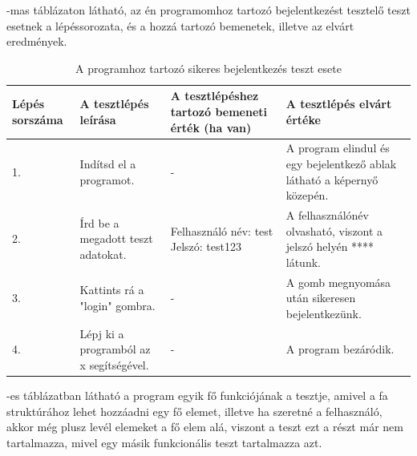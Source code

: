 -mas táblázaton látható, az én programomhoz tartozó bejelentkezést tesztelő teszt esetnek a lépéssorozata, és a hozzá tartozó bemenetek, illetve az elvárt eredmények.

\begin{table} [h]
	\begin{center}
		\caption{A programhoz tartozó sikeres bejelentkezés teszt esete}
		\label{table:successcase}
		\resizebox{\textwidth}{!} {
			\begin{tabular}{ |p{3cm}|p{5cm}|p{5cm}|p{5cm}| } 
				\hline
				Lépés sorszáma & A tesztlépés leírása & A tesztlépéshez tartozó bemeneti érték (ha van) & A tesztlépés elvárt értéke  \\ 
				\hline
				1. & Indítsd el a programot. & - & A program elindul és egy bejelentkező ablak látható a képernyő közepén.  \\ 
				\hline
				2. & Írd be a megadott teszt adatokat. & Felhasználó név: test \newline Jelszó: test123 & A felhasználónév olvasható, viszont a jelszó helyén **** látunk.\\ 
				\hline
				3. & Kattints rá a "login" gombra. & - & A gomb megnyomása után sikeresen bejelentkezünk. \\
				\hline
				4. & Lépj ki a programból az x segítségével. & - & A program bezáródik. \\
				\hline
			\end{tabular}
		}
	\end{center}

\end{table}

-es táblázatban látható a program egyik fő funkciójának a tesztje, amivel a fa struktúrához lehet hozzáadni egy fő elemet, illetve ha szeretné a felhasználó, akkor még plusz levél elemeket a fő elem alá, viszont a teszt ezt a részt már nem tartalmazza, mivel egy másik funkcionális teszt tartalmazza azt.

